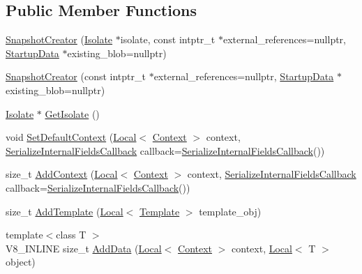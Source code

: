 \subsection*{Public Member Functions}
\begin{DoxyCompactItemize}
\item 
\mbox{\hyperlink{classv8_1_1SnapshotCreator_a561a072e2d0656946b8b976fa2769dea}{Snapshot\+Creator}} (\mbox{\hyperlink{classv8_1_1Isolate}{Isolate}} $\ast$isolate, const intptr\+\_\+t $\ast$external\+\_\+references=nullptr, \mbox{\hyperlink{classv8_1_1StartupData}{Startup\+Data}} $\ast$existing\+\_\+blob=nullptr)
\item 
\mbox{\hyperlink{classv8_1_1SnapshotCreator_acde479ff9349a5f61d3e1bd4bc78d833}{Snapshot\+Creator}} (const intptr\+\_\+t $\ast$external\+\_\+references=nullptr, \mbox{\hyperlink{classv8_1_1StartupData}{Startup\+Data}} $\ast$existing\+\_\+blob=nullptr)
\item 
\mbox{\hyperlink{classv8_1_1Isolate}{Isolate}} $\ast$ \mbox{\hyperlink{classv8_1_1SnapshotCreator_a6f9acab93ba6bc6232cd1bfead27dec1}{Get\+Isolate}} ()
\item 
void \mbox{\hyperlink{classv8_1_1SnapshotCreator_aaeed7b1a205009c62d7e60deefe6e805}{Set\+Default\+Context}} (\mbox{\hyperlink{classv8_1_1Local}{Local}}$<$ \mbox{\hyperlink{classv8_1_1Context}{Context}} $>$ context, \mbox{\hyperlink{structv8_1_1SerializeInternalFieldsCallback}{Serialize\+Internal\+Fields\+Callback}} callback=\mbox{\hyperlink{structv8_1_1SerializeInternalFieldsCallback}{Serialize\+Internal\+Fields\+Callback}}())
\item 
size\+\_\+t \mbox{\hyperlink{classv8_1_1SnapshotCreator_aefaa477c494707e73b493047f4711a0a}{Add\+Context}} (\mbox{\hyperlink{classv8_1_1Local}{Local}}$<$ \mbox{\hyperlink{classv8_1_1Context}{Context}} $>$ context, \mbox{\hyperlink{structv8_1_1SerializeInternalFieldsCallback}{Serialize\+Internal\+Fields\+Callback}} callback=\mbox{\hyperlink{structv8_1_1SerializeInternalFieldsCallback}{Serialize\+Internal\+Fields\+Callback}}())
\item 
size\+\_\+t \mbox{\hyperlink{classv8_1_1SnapshotCreator_aba2fdfb11dd2016a80fa9b812c1e4287}{Add\+Template}} (\mbox{\hyperlink{classv8_1_1Local}{Local}}$<$ \mbox{\hyperlink{classv8_1_1Template}{Template}} $>$ template\+\_\+obj)
\item 
{\footnotesize template$<$class T $>$ }\\V8\+\_\+\+I\+N\+L\+I\+NE size\+\_\+t \mbox{\hyperlink{classv8_1_1SnapshotCreator_a7388b4c160b8d1b6b7ff23833bafb339}{Add\+Data}} (\mbox{\hyperlink{classv8_1_1Local}{Local}}$<$ \mbox{\hyperlink{classv8_1_1Context}{Context}} $>$ context, \mbox{\hyperlink{classv8_1_1Local}{Local}}$<$ T $>$ object)

\end{DoxyCompactItemize}
